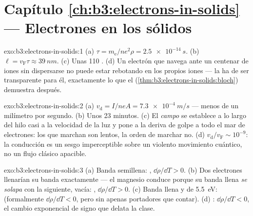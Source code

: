 \section*{Capítulo \ref{ch:b3:electrons-in-solids} --- Electrones en los sólidos}

\begin{solution}{exo:b3:electrons-in-solids:1}
(a) $\tau = m_{\text{e}}/ne^2\rho = \qty{2.5e-14}{s}$. (b) $\ell =
v_{\text{F}}\tau \approx \qty{39}{nm}$. (c) Unas 110 . (d) Un electrón que navega ante un centenar de iones sin
dispersarse no puede estar rebotando en los propios iones --- la
 ha de ser transparente para él, exactamente lo que el 
(\cref{thm:b3:electrons-in-solids:bloch}) demuestra después.
\end{solution}

\begin{solution}{exo:b3:electrons-in-solids:2}
(a) $v_{\text{d}} = I/neA = \qty{7.3e-4}{m/s}$ --- menos de un
milímetro por segundo. (b) Unos 23 minutos. (c) El \emph{campo}
se establece a lo largo del hilo casi a la velocidad de la luz y pone
a la deriva de golpe a todo el mar de electrones: los que marchan son lentos,
la orden de marchar no. (d) $v_{\text{d}}/v_{\text{F}} \sim
10^{-9}$: la conducción es un sesgo imperceptible sobre un violento
movimiento cuántico, no un flujo clásico apacible.
\end{solution}

\begin{solution}{exo:b3:electrons-in-solids:3}
(a) Banda semillena: , $\dd\rho/\dd T > 0$. (b) Dos
electrones llenarían su banda exactamente --- el magnesio conduce
porque su banda llena \emph{se solapa} con la siguiente, vacía: ,
$\dd\rho/\dd T > 0$. (c) Banda llena y  de \qty{5.5}{eV}: 
(formalmente $\dd\rho/\dd T < 0$, pero sin apenas portadores
que contar). (d) : $\dd\rho/\dd T < 0$, el
cambio exponencial de signo que delata la clase.
\end{solution}

